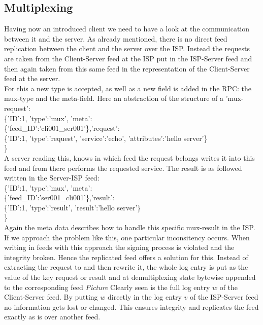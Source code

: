 \subsection{Multiplexing}
Having now an introduced client we need to have a look at the communication between it and the server. As already mentioned, there is no direct feed replication between the client and the server over the ISP. Instead the requests are taken from the Client-Server feed at the ISP put in the ISP-Server feed and then again taken from this same feed in the representation of the Client-Server feed at the server.\\
For this a new type is accepted, as well as a new field is added in the RPC: the mux-type and the meta-field. Here an abstraction of the structure of a 'mux-request':\\
\{'ID':1, 'type':'mux', 'meta':\\\{'feed\_ID':'cli001\_ser001'\},'request':\\\{'ID':1, 'type':'request', 'service':'echo', 'attributes':'hello server'\}\\\}\\
A server reading this, knows in which feed the request belongs writes it into this feed and from there performs the requested service. The result is as followed written in the Server-ISP feed:\\
\{'ID':1, 'type':'mux', 'meta':\\\{'feed\_ID':'ser001\_cli001'\},'result':\\\{'ID':1, 'type':'result', 'result':'hello server'\}\\\}\\
Again the meta data describes how to handle this specific mux-result in the ISP.\\
If we approach the problem like this, one particular inconsitency occurs. When writing in feeds with this approach the signing process is violated and the integrity broken. Hence the replicated feed offers a solution for this. Instead of extracting the request to and then rewrite it, the whole log entry is put as the value of the key request or result and at demultiplexing state bytewise appended to the corresponding feed
\textit{Picture}
Clearly seen is the full log entry $w$ of the Client-Server feed. By putting $w$ directly in the log entry $v$ of the ISP-Server feed no information gets lost or changed. This ensures integrity and replicates the feed exactly as is over another feed.
